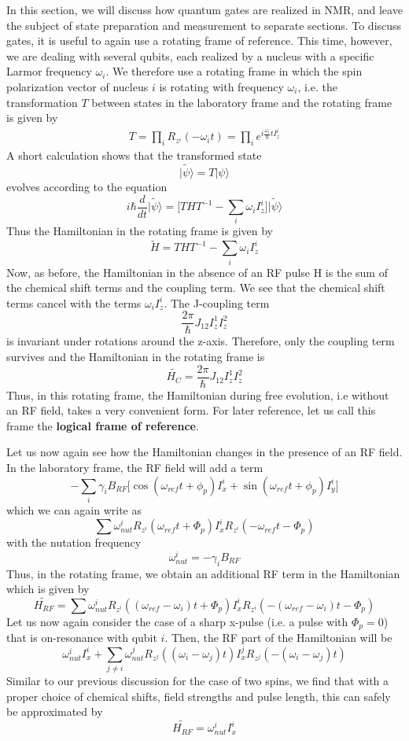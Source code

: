 \documentclass[a4paper, draft]{article}
\theoremstyle{own}
\theoremstyle{remark}
\begin{document}
In this section, we will discuss how quantum gates are realized in NMR, and leave the subject of state preparation and measurement to separate sections. To discuss gates, it is useful to again use a rotating frame of reference. This time, however, we are dealing with several qubits, each realized by a nucleus with a specific Larmor frequency $\omega_i$. We therefore use a rotating frame in which the spin polarization vector of nucleus $i$ is rotating with frequency $\omega_i$, i.e. the transformation $T$ between states in the laboratory frame and the rotating frame is given by
\begin{align}\label{eq:logicalframetransformation}
T = \prod_i R_{z^i}(-\omega_i t) = \prod_i e^{i\frac{\omega_i}{\hbar}t I_z^i} 
\end{align}
A short calculation shows that the transformed state
$$
\widetilde{|\psi \rangle} = T |\psi \rangle
$$
evolves according to the equation
$$
i \hbar \frac{d}{dt} \widetilde{|\psi \rangle} = 
\big[
T H T^{-1} - \sum_i \omega_i I^i_z 
\big]
\widetilde{|\psi\rangle}
$$
Thus the Hamiltonian in the rotating frame is given by 
$$
\widetilde{H} = T H T^{-1} - \sum_i \omega_i I^i_z 
$$
Now, as before, the Hamiltonian in the absence of an RF pulse H is the sum of the chemical shift terms and the coupling term. We see that the chemical shift terms cancel with the terms $\omega_i I^i_z$. The J-coupling term
$$
\frac{2 \pi}{\hbar} J_{12} I^1_z I^2_z
$$
is invariant under rotations around the z-axis. Therefore, only the coupling term survives and the Hamiltonian in the rotating frame is
$$
\widetilde{H_C} = \frac{2 \pi}{\hbar} J_{12} I^1_z I^2_z
$$
Thus, in this rotating frame, the Hamiltonian during free evolution, i.e without an RF field, takes a very convenient form. For later reference, let us call this frame the {\bf logical frame of reference}.

Let us now again see how the Hamiltonian changes in the presence of an RF field. In the laboratory frame, the RF field will add a term
$$
- \sum_i \gamma_i B_{RF} \big[ \cos (\omega_{ref} t + \phi_p) I_x^i + \sin(\omega_{ref} t + \phi_p) I_y^i \big]
$$
which we can again write as
$$
\sum \omega_{nut}^i R_{z^i}(\omega_{ref} t + \Phi_p) I_x^i R_{z^i}(-\omega_{ref} t - \Phi_p) 
$$
with the nutation frequency
$$
\omega_{nut}^i = - \gamma_i B_{RF}
$$
Thus, in the rotating frame, we obtain an additional RF term in the Hamiltonian which is given by
$$
\widetilde{H_{RF}} = \sum \omega_{nut}^i R_{z^i}((\omega_{ref} - \omega_i)t+\Phi_p) I_x^i R_{z^i}(- (\omega_{ref} - \omega_i) t- \Phi_p) 
$$
Let us now again consider the case of a sharp x-pulse (i.e. a pulse with $\Phi_p = 0$) that is on-resonance with qubit $i$. Then, the RF part of the Hamiltonian will be
$$
\omega^i_{nut} I_x^i + \sum_{j \neq i} \omega_{nut}^j R_{z^j}((\omega_i - \omega_j)t) I_x^j R_{z^j}(- (\omega_i - \omega_j)t) 
$$
Similar to our previous discussion for the case of two spins, we find that with a proper choice of chemical shifts, field strengths and pulse length, this can safely be approximated by 
$$
\widetilde{H_{RF}} = \omega^i_{nut} I_x^i
$$
\end{document}
